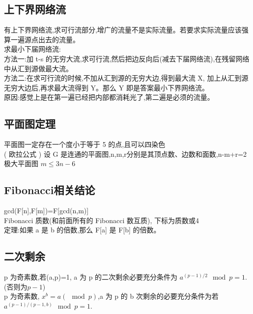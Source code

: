 \subsection*{上下界网络流}
	有上下界网络流,求可行流部分,增广的流量不是实际流量。若要求实际流量应该强算一遍源点出去的流量。\\
	求最小下届网络流:\\
	方法一:加 t-s 的无穷大流,求可行流,然后把边反向后(减去下届网络流),在残留网络中从汇到源做最大流。\\
	方法二:在求可行流的时候,不加从汇到源的无穷大边,得到最大流 X, 加上从汇到源无穷大边后,再求最大流得到 Y。那么 Y 即是答案最小下界网络流。\\
	原因:感觉上是在第一遍已经把内部都消耗光了,第二遍是必须的流量。

\subsection*{平面图定理}
	平面图一定存在一个度小于等于 5 的点,且可以四染色\\
	( 欧拉公式 ) 设 G 是连通的平面图,n,m,r分别是其顶点数、边数和面数,n-m+r=2\\
	极大平面图 $m\leq 3n-6$

\subsection*{Fibonacci相关结论}
	gcd(F[n],F[m])=F[gcd(n,m)]\\
	Fibonacci 质数(和前面所有的 Fibonacci 数互质), 下标为质数或4\\
	定理:如果 a 是 b 的倍数,那么 F[a] 是 F[b] 的倍数。\\

\subsection*{二次剩余}
	p 为奇素数,若(a,p)=1, a 为 p 的二次剩余必要充分条件为 $a^{(p-1)/2} \mod p=1$.(否则为$p-1$)\\
	p 为奇素数, $x^b=a(\mod p)$,a 为 p 的 b 次剩余的必要充分条件为若 $a^{(p-1)/ (p-1, b)} \mod p=1$.
